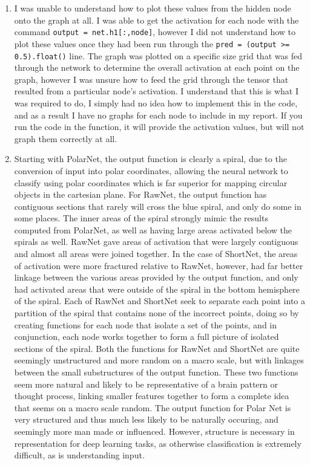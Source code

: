 \documentclass[a4paper,11pt]{article}
\newcommand{\code}{\texttt}
\begin{document}
{{\begin{enumerate}[leftmargin=*]
		\item I was unable to understand how to plot these values from the hidden node onto the graph at all. I was able to get the activation for each node with the command \code{output = net.h1[:,node]}, however I did not understand how to plot these values once they had been run through the \code{pred = (output >= 0.5).float()} line. The graph was plotted on a specific size grid that was fed through the network to determine the overall activation at each point on the graph, however I was unsure how to feed the grid through the tensor that resulted from a particular node's activation. I understand that this is what I was required to do, I simply had no idea how to implement this in the code, and as a result I have no graphs for each node to include in my report. If you run the code in the function, it will provide the activation values, but will not graph them correctly at all.
		\item Starting with PolarNet, the output function is clearly a spiral, due to the conversion of input into polar coordinates, allowing the neural network to classify using polar coordinates which is far superior for mapping circular objects in the cartesian plane. For RawNet, the output function has contiguous sections that rarely will cross the blue spiral, and only do some in some places. The inner areas of the spiral strongly mimic the results computed from PolarNet, as well as having large areas activated below the spirals as well. RawNet gave areas of activation that were largely contiguous and almost all areas were joined together. In the case of ShortNet, the areas of activation were more fractured relative to RawNet, however, had far better linkage between the various areas provided by the output function, and only had activated areas that were outside of the spiral in the bottom hemisphere of the spiral. Each of RawNet and ShortNet seek to separate each point into a partition of the spiral that contains none of the incorrect points, doing so by creating functions for each node that isolate a set of the points, and in conjunction, each node works together to form a full picture of isolated sections of the spiral.
			\bigbreak
			Both the functions for RawNet and ShortNet are quite seemingly unstructured and more random on a macro scale, but with linkages between the small substructures of the output function. These two functions seem more natural and likely to be representative of a brain pattern or thought process, linking smaller features together to form a complete idea that seems on a macro scale random. The output function for Polar Net is very structured and thus much less likely to be naturally occuring, and seemingly more man made or influenced. However, structure is necessary in representation for deep learning tasks, as otherwise classification is extremely difficult, as is understanding input. 

\end{enumerate}}}
\end{document}
